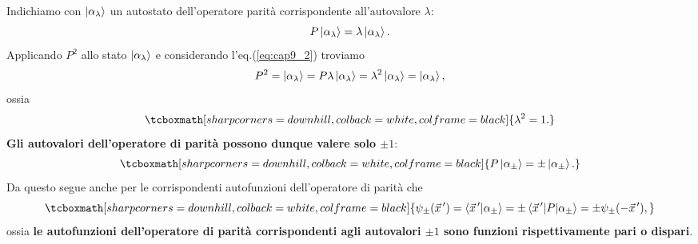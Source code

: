 \documentclass[a4paper,12pt,oneside]{book}
\begin{document}
Indichiamo con $\ket{\alpha_{\lambda}}$ un autostato dell'operatore parità corrispondente all'autovalore $\lambda$:
	\begin{equation}
	  P\ket{\alpha_{\lambda}} = \lambda\ket{\alpha_{\lambda}} .
	\end{equation}
Applicando $P^2$ allo stato $\ket{\alpha_{\lambda}}$ e considerando l'eq.(\ref{eq:cap9_2}) troviamo
	\begin{equation}
	  P^2 = \ket{\alpha_{\lambda}} = P\lambda\ket{\alpha_{\lambda}} = \lambda^2\ket{\alpha_{\lambda}} = \ket{\alpha_{\lambda}} ,
	\end{equation}
ossia
	\begin{equation}
		\tcboxmath[sharp corners=downhill, colback=white, colframe=black]{
			\lambda^2 = 1 .
			}
	\end{equation}
\textbf{Gli autovalori dell'operatore di parità possono dunque valere solo $\pm1$}:
	\begin{equation}
		\tcboxmath[sharp corners=downhill, colback=white, colframe=black]{
			P\ket{\alpha_{\pm}} = \pm\ket{\alpha_{\pm}} .
			}
	\end{equation}
Da questo segue anche per le corrispondenti autofunzioni dell'operatore di parità che
	\begin{equation}
		\tcboxmath[sharp corners=downhill, colback=white, colframe=black]{
			\psi_{\pm}\qty(\vec{x}^{\, \prime}) = \braket{\vec{x}^{\, \prime}}{\alpha_{\pm}} = \pm\mel{\vec{x}^{\, \prime}}{P}{\alpha_{\pm}} = \pm\psi_{\pm}\qty(-\vec{x}^{\, \prime}) ,
			}
	\end{equation}
ossia \textbf{le autofunzioni dell'operatore di parità corrispondenti agli autovalori $\pm1$ sono funzioni rispettivamente pari o dispari}.\\
\end{document}
